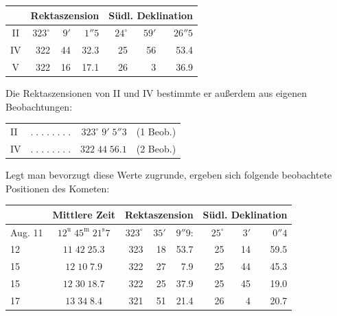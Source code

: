 \begin{center}\fontsize{10}{12}\selectfont\setlength{\tabcolsep}{4pt}\renewcommand{\arraystretch}{1.15}\begin{tabular}{c|rrr|rrr}
& \multicolumn{3}{c|}{Rektaszension} & \multicolumn{3}{c}{Südl. Deklination}\\\hline
II & $323^\circ$ & $9'$ & $1''5$ & $24^\circ$ & $59'$ & $26''5$\\
IV & 322 & 44 & 32.3 & 25 & 56 & 53.4\\
V & 322 & 16 & 17.1 & 26 & 3 & 36.9\\
\end{tabular}\end{center}

\par\indent Die Rektaszensionen von II und IV bestimmte er außerdem aus eigenen Beobachtungen:

\begin{center}\fontsize{10}{12}\selectfont\setlength{\tabcolsep}{4pt}\renewcommand{\arraystretch}{1.15}\begin{tabular}{lcrl}
II & $.\;.\;.\;.\;.\;.\;.\;.$ & $323^\circ\;9'\;5''3$ & (1 Beob.)\\
IV & $.\;.\;.\;.\;.\;.\;.\;.$ & $322\;44\;56.1$ & (2 Beob.)\\
\end{tabular}\end{center}

\par\indent Legt man bevorzugt diese Werte zugrunde, ergeben sich folgende beobachtete Positionen des Kometen:

\begin{center}\fontsize{9}{11}\selectfont\setlength{\tabcolsep}{3pt}\renewcommand{\arraystretch}{1.15}\begin{tabular}{l|c|rrr|rrr}
& Mittlere Zeit & \multicolumn{3}{c|}{Rektaszension} & \multicolumn{3}{c}{Südl. Deklination}\\\hline
Aug. 11 & $12^{\mathrm u}\;45^{\mathrm m}\;21^{\mathrm s}7$ & $323^\circ$ & $35'$ & $9''9$: & $25^\circ$ & $3'$ & $0''4$\\
12 & $11\;42\;25.3$ & 323 & 18 & 53.7 & 25 & 14 & 59.5\\
15 & $12\;10\;7.9$ & 322 & 27 & 7.9 & 25 & 44 & 45.3\\
15 & $12\;30\;18.7$ & 322 & 25 & 37.9 & 25 & 45 & 19.0\\
17 & $13\;34\;8.4$ & 321 & 51 & 21.4 & 26 & 4 & 20.7\\
\end{tabular}\end{center}

